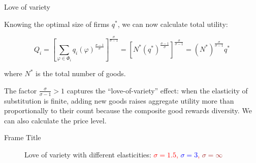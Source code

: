 \documentclass[notes,11pt, aspectratio=169, xcolor=table]{beamer}
\newenvironment{wideitemize}{\itemize\addtolength{\itemsep}{10pt}}{\enditemize}
\begin{document}
\begin{frame}{Love of variety}

\begin{wideitemize}
    \item Knowing the optimal size of firms $q^*$, we can now calculate total utility:

\begin{equation*}
    Q_i = \left[ \sum_{\varphi \in \Phi_i } q_i(
\varphi)^{\tfrac{\sigma-1}{\sigma}} \right]^{\tfrac{\sigma}{\sigma-1} }  = \left[ N^* ( q^*
)^{\tfrac{\sigma-1}{\sigma}} \right]^{\tfrac{\sigma}{\sigma-1} } = (N^*)^{\tfrac{\sigma}{\sigma-1} } q^* 
\end{equation*}

\noindent where $N^*$ is the total number of goods.

\item The factor $\tfrac{\sigma}{\sigma-1}>1$ captures the “love-of-variety” effect: when the elasticity of substitution is finite, adding new goods raises aggregate utility more than proportionally to their count because the composite good rewards diversity. We can also calculate the price level.

\end{wideitemize}

\end{frame}

\begin{frame}{Frame Title}
        \begin{figure}[htp]
        \centering
            \caption{Love of variety with different elasticities: \textcolor{red}{$\sigma=1.5$, \textcolor{blue}{$\sigma=3$}, \textcolor{brown}{$\sigma=\infty$}}}
        \label{fig: ces-love}
    \end{figure}
\end{frame}
\end{document}
